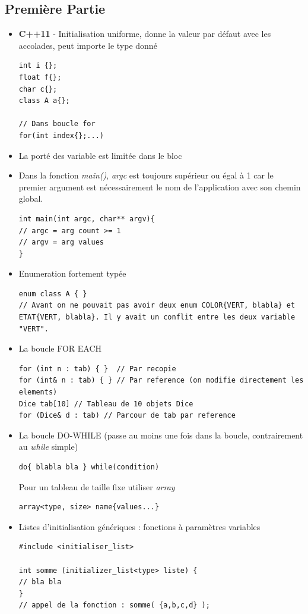 \documentclass[12pt,a4paper]{article}
\begin{document}
\subsection{Première Partie}
\begin{itemize}
\item \textbf{C++11} - Initialisation uniforme, donne la valeur par défaut avec les accolades, peut importe le type donné
\begin{lstlisting}
int i {};
float f{};
char c{};
class A a{};

// Dans boucle for
for(int index{};...)
\end{lstlisting}
\item La porté des variable est limitée dans le bloc
\item Dans la fonction \textit{main()}, \textit{argc} est toujours supérieur ou égal à 1 car le premier argument est nécessairement le nom de l'application avec son chemin global.
\begin{lstlisting}
int main(int argc, char** argv){
// argc = arg count >= 1
// argv = arg values
}
\end{lstlisting}
\item Enumeration fortement typée
\begin{lstlisting}
enum class A { }
// Avant on ne pouvait pas avoir deux enum COLOR{VERT, blabla} et ETAT{VERT, blabla}. Il y avait un conflit entre les deux variable "VERT".
\end{lstlisting}
\item La boucle FOR EACH
\begin{lstlisting}
for (int n : tab) { }  // Par recopie
for (int& n : tab) { } // Par reference (on modifie directement les elements)
Dice tab[10] // Tableau de 10 objets Dice
for (Dice& d : tab) // Parcour de tab par reference
\end{lstlisting}
\item La boucle DO-WHILE (passe au moins une fois dans la boucle, contrairement au \textit{while} simple)
\begin{lstlisting}
do{ blabla bla } while(condition)
\end{lstlisting}
Pour un tableau de taille fixe utiliser \textit{array}
\begin{lstlisting}
array<type, size> name{values...}
\end{lstlisting}
\item Listes d'initialisation génériques : fonctions à paramètres variables
\begin{lstlisting}
#include <initialiser_list>

int somme (initializer_list<type> liste) {
// bla bla
}
// appel de la fonction : somme( {a,b,c,d} );
\end{lstlisting}
\end{itemize}
\end{document}
